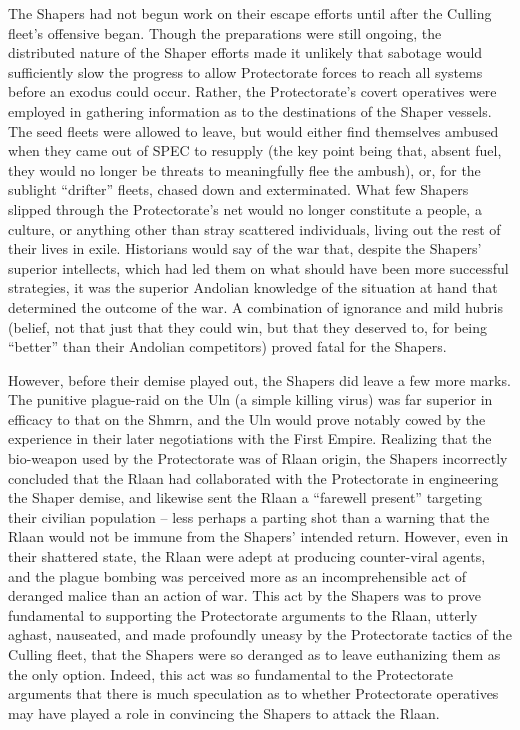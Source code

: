 The Shapers had not begun work on their escape efforts until after the Culling fleet’s offensive began. Though the preparations were still ongoing, the distributed nature of the Shaper efforts made it unlikely that sabotage would sufficiently slow the progress to allow Protectorate forces to reach all systems before an exodus could occur. Rather, the Protectorate’s covert operatives were employed in gathering information as to the destinations of the Shaper vessels. The seed fleets were allowed to leave, but would either find themselves ambused when they came out of SPEC to resupply (the key point being that, absent fuel, they would no longer be threats to meaningfully flee the ambush), or, for the sublight “drifter” fleets, chased down and exterminated. What few Shapers slipped through the Protectorate’s net would no longer constitute a people, a culture, or anything other than stray scattered individuals, living out the rest of their lives in exile. Historians would say of the war that, despite the Shapers’ superior intellects, which had led them on what should have been more successful strategies, it was the superior Andolian knowledge of the situation at hand that determined the outcome of the war. A combination of ignorance and mild hubris (belief, not that just that they could win, but that they deserved to, for being “better” than their Andolian competitors) proved fatal for the Shapers.

However, before their demise played out, the Shapers did leave a few more marks. The punitive plague-raid on the Uln (a simple killing virus) was far superior in efficacy to that on the Shmrn, and the Uln would prove notably cowed by the experience in their later negotiations with the First Empire. Realizing that the bio-weapon used by the Protectorate was of Rlaan origin, the Shapers incorrectly concluded that the Rlaan had collaborated with the Protectorate in engineering the Shaper demise, and likewise sent the Rlaan a “farewell present” targeting their civilian population – less perhaps a parting shot than a warning that the Rlaan would not be immune from the Shapers’ intended return. However, even in their shattered state, the Rlaan were adept at producing counter-viral agents, and the plague bombing was perceived more as an incomprehensible act of deranged malice than an action of war. This act by the Shapers was to prove fundamental to supporting the Protectorate arguments to the Rlaan, utterly aghast, nauseated, and made profoundly uneasy by the Protectorate tactics of the Culling fleet, that the Shapers were so deranged as to leave euthanizing them as the only option. Indeed, this act was so fundamental to the Protectorate arguments that there is much speculation as to whether Protectorate operatives may have played a role in convincing the Shapers to attack the Rlaan.

